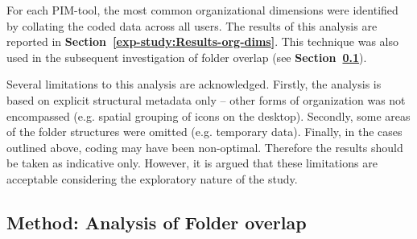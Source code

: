 For each PIM-tool, the most common organizational dimensions were identified by collating the coded data across all users.  The results of this analysis are reported in \textbf{Section~\ref{exp-study:Results-org-dims}}. This technique was also used in the subsequent investigation of folder overlap (see \textbf{Section~\ref{exp-study:analysis-folder-overlap}}). %


Several limitations to this analysis are acknowledged.  Firstly, the analysis is based on explicit structural metadata only -- other forms of organization was not encompassed (e.g. spatial grouping of icons on the desktop).  Secondly, some areas of the folder structures were omitted (e.g. temporary data). Finally, in the cases outlined above, coding may have been non-optimal.  Therefore the results should be taken as indicative only. However, it is argued that these limitations are acceptable considering the exploratory nature of the study.




\subsection{Method: Analysis of Folder overlap}
\label{exp-study:analysis-folder-overlap}

